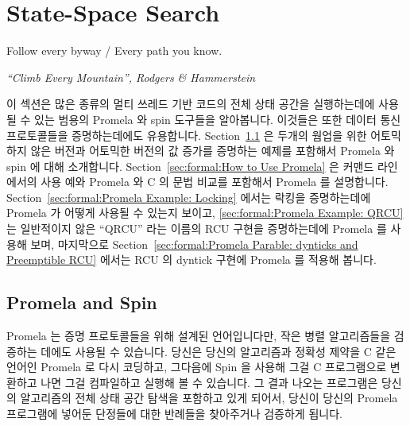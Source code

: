 
\section{State-Space Search}
\label{sec:formal:State-Space Search}
%
\epigraph{Follow every byway / Every path you know.}
	 {\emph{``Climb Every Mountain'', Rodgers \& Hammerstein}}

이 섹션은 많은 종류의 멀티 쓰레드 기반 코드의 전체 상태 공간을 실행하는데에
사용될 수 있는 범용의 Promela 와 spin 도구들을 알아봅니다.
이것들은 또한 데이터 통신 프로토콜들을 증명하는데에도 유용합니다.
Section~\ref{sec:formal:Promela and Spin}
은 두개의 웜업을 위한 어토믹 하지 않은 버전과 어토믹한 버전의 값 증가를
증명하는 예제를 포함해서 Promela 와 spin 에 대해 소개합니다.
Section~\ref{sec:formal:How to Use Promela}
은 커맨드 라인에서의 사용 예와 Promela 와 C 의 문법 비교를 포함해서 Promela 를
설명합니다.
Section~\ref{sec:formal:Promela Example: Locking}
에서는 락킹을 증명하는데에 Promela 가 어떻게 사용될 수 있는지 보이고,
\ref{sec:formal:Promela Example: QRCU}
는 일반적이지 않은 ``QRCU'' 라는 이름의 RCU 구현을 증명하는데에 Promela 를
사용해 보며, 마지막으로
Section~\ref{sec:formal:Promela Parable: dynticks and Preemptible RCU}
에서는 RCU 의 dyntick 구현에 Promela 를 적용해 봅니다.
\iffalse

This section features the general-purpose Promela and spin tools,
which may be used to carry out a full
state-space search of many types of multi-threaded code.
They are also quite useful for verifying data communication protocols.
Section~\ref{sec:formal:Promela and Spin}
introduces Promela and spin, including a couple of warm-up exercises
verifying both non-atomic and atomic increment.
Section~\ref{sec:formal:How to Use Promela}
describes use of Promela, including example command lines and a
comparison of Promela syntax to that of C.
Section~\ref{sec:formal:Promela Example: Locking}
shows how Promela may be used to verify locking,
\ref{sec:formal:Promela Example: QRCU}
uses Promela to verify an unusual implementation of RCU named ``QRCU'',
and finally
Section~\ref{sec:formal:Promela Parable: dynticks and Preemptible RCU}
applies Promela to RCU's dyntick-idle implementation.
\fi

\subsection{Promela and Spin}
\label{sec:formal:Promela and Spin}

Promela 는 증명 프로토콜들을 위해 설계된 언어입니다만, 작은 병렬 알고리즘들을
검증하는 데에도 사용될 수 있습니다.
당신은 당신의 알고리즘과 정확성 제약을 C 같은 언어인 Promela 로 다시 코딩하고,
그다음에 Spin 을 사용해 그걸 C 프로그램으로 변환하고 나면 그걸 컴파일하고
실행해 볼 수 있습니다.
그 결과 나오는 프로그램은 당신의 알고리즘의 전체 상태 공간 탐색을 포함하고 있게
되어서, 당신이 당신의 Promela 프로그램에 넣어둔 단정들에 대한 반례들을
찾아주거나 검증하게 됩니다.
\iffalse

